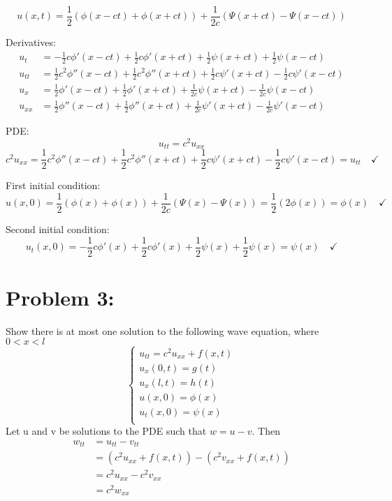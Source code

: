 \documentclass[12pt]{article}
\begin{document}
\color{blue}
\[u(x, t) = \frac{1}{2}(\phi(x - ct) + \phi(x + ct)) + \frac{1}{2c}(\Psi(x + ct) - \Psi(x -ct))\]

Derivatives:
\begin{align*}
    u_t &= -\frac{1}{2}c\phi'(x - ct) + \frac{1}{2}c\phi'(x + ct) + \frac{1}{2}\psi(x + ct) + \frac{1}{2}\psi(x - ct)\\
    u_{tt} &= \frac{1}{2}c^2 \phi''(x- ct) + \frac{1}{2}c^2\phi''(x + ct) + \frac{1}{2}c\psi'(x + ct) - \frac{1}{2}c\psi'(x -ct)\\
    u_x &= \frac{1}{2}\phi'(x - ct) + \frac{1}{2}\phi'(x + ct) + \frac{1}{2c}\psi(x + ct) - \frac{1}{2c}\psi(x -ct)\\
    u_{xx} &= \frac{1}{2}\phi''(x - ct) + \frac{1}{2}\phi''(x + ct) + \frac{1}{2c}\psi'(x + ct) - \frac{1}{2c}\psi'(x -ct)
\end{align*}

PDE:
\[u_{tt} = c^2 u_{xx}\]
\[c^2u_{xx} = \frac{1}{2}c^2 \phi''(x- ct) + \frac{1}{2}c^2\phi''(x + ct) + \frac{1}{2}c\psi'(x + ct) - \frac{1}{2}c\psi'(x -ct) = u_{tt} \quad \checkmark\]

First initial condition:
\[u(x, 0) = \frac{1}{2}(\phi(x) + \phi(x)) + \frac{1}{2c}(\Psi(x) - \Psi(x)) = \frac{1}{2}(2\phi(x)) = \phi(x) \quad \checkmark\]

Second initial condition:
\[u_t(x, 0) = -\frac{1}{2}c\phi'(x) + \frac{1}{2}c\phi'(x) + \frac{1}{2}\psi(x) + \frac{1}{2}\psi(x) = \psi(x) \quad \checkmark\]
\pagebreak
\color{black}
\section*{Problem 3:} 
Show there is at most one solution to the following wave equation, where $0 < x < l$
\[\begin{cases}
    u_{tt} = c^2u_{xx} + f(x, t)\\
    u_x(0, t) = g(t)\\
    u_x(l, t) = h(t)\\
    u(x, 0) = \phi(x)\\
    u_t(x, 0) = \psi(x)\\
\end{cases}\]
\color{blue}
Let u and v be solutions to the PDE such that $w = u - v$.
Then 
\begin{align*}
    w_{tt} &= u_{tt} - v_{tt}\\
    &= (c^2 u_{xx} + f(x, t)) - (c^2 v_{xx} + f(x, t))\\
    &= c^2u_{xx} - c^2v_{xx}\\
    &= c^2 w_{xx}
\end{align*}
\end{document}
